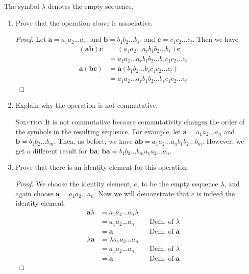 \documentclass[draft,twoside]{amsart}
\newcommand{\Solution}{\textsc{Solution}\xspace}
\begin{document}
The symbol $\lambda$ denotes the empty sequence.

\begin{enumerate}
   \item Prove that the operation above is associative.
   
   \begin{proof}
      Let $\mathbf{a} = a_1 a_2 \ldots a_r$, and $\mathbf{b} = b_1 b_2
      \ldots b_s$, and $\mathbf{c} = c_1 c_2 \ldots c_t$. Then we have
      \begin{align*}
        (\mathbf{ab})\mathbf{c} 
	               & = (a_1 a_2 \ldots a_r b_1 b_2 \ldots b_s)\mathbf{c}\\
	               & = a_1 a_2 \ldots a_r b_1 b_2 \ldots b_s c_1 c_2 
		           \ldots c_t \\
        \mathbf{a}(\mathbf{bc})
	               & = \mathbf{a}(b_1 b_2 \ldots b_s c_1 c_2 \ldots c_t)\\
	               & = a_1 a_2 \ldots a_r b_1 b_2 \ldots b_s c_1 c_2 
		           \ldots c_t 
      \end{align*}
   \end{proof}

   \item Explain why the operation is not commutative. 
   
   \noindent \Solution It is not commutative
   because commutativity changes the order of the symbols in the resulting
   sequence. For example, let $\mathbf{a} = a_1 a_2 \ldots a_n$ and 
   $\mathbf{b} = b_1 b_2 \ldots b_m$. Then, as before, we have 
   $\mathbf{ab} = a_1 a_2 \ldots a_n b_1 b_2 \ldots b_m$. However, we
   get a different result for $\mathbf{ba}$: $\mathbf{ba} = b_1 b_2 \ldots
   b_m a_1 a_2 \ldots a_n$.

   \item Prove that there is an identity element for this operation.

   \begin{proof}
      We choose the identity element, $e$, to be the empty sequence $\lambda$,
      and again choose $\mathbf{a} = a_1 a_2 \ldots a_n$.
      Now we will demonstrate that $e$ is indeed the identity element.
      \begin{align*}
         \mathbf{a}\lambda & = a_1 a_2 \ldots a_n \lambda \\
	                   & = a_1 a_2 \ldots a_n 
			            && \text{Defn. of $\lambda$} \\
			   & = \mathbf{a} && \text{Defn. of $\mathbf{a}$} \\
	 \lambda\mathbf{a} & = \lambda a_1 a_2 \ldots a_n \\
	                   & = a_1 a_2 \ldots a_n 
			            && \text{Defn. of $\lambda$} \\
			   & = \mathbf{a} && \text{Defn. of $\mathbf{a}$} 
      \end{align*}
   \end{proof}

\end{enumerate}
\end{document}
